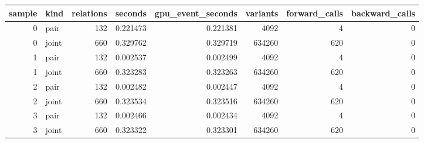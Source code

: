 \begin{tabular}{rlrrrrrr}
\toprule
sample & kind & relations & seconds & gpu_event_seconds & variants & forward_calls & backward_calls \\
\midrule
0 & pair & 132 & 0.221473 & 0.221381 & 4092 & 4 & 0 \\
0 & joint & 660 & 0.329762 & 0.329719 & 634260 & 620 & 0 \\
1 & pair & 132 & 0.002537 & 0.002499 & 4092 & 4 & 0 \\
1 & joint & 660 & 0.323283 & 0.323263 & 634260 & 620 & 0 \\
2 & pair & 132 & 0.002482 & 0.002447 & 4092 & 4 & 0 \\
2 & joint & 660 & 0.323534 & 0.323516 & 634260 & 620 & 0 \\
3 & pair & 132 & 0.002466 & 0.002434 & 4092 & 4 & 0 \\
3 & joint & 660 & 0.323322 & 0.323301 & 634260 & 620 & 0 \\
\bottomrule
\end{tabular}
